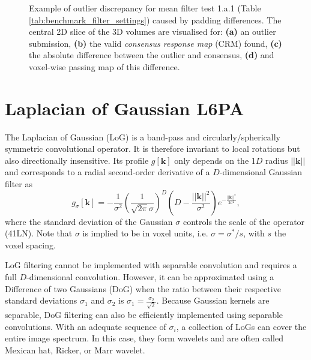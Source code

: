 \documentclass[fleqn,a4paper,oneside,openany]{book}
\newcommand\id[1]{{\hfill\normalsize{\idfont #1}}}
\newcommand\textid[1]{{\normalsize{\idfont #1}}}
\begin{document}
\begin{figure}[!t]
\begin{minipage}[b]{0.45\textwidth}
   \end{minipage} 
   \caption{Example of outlier discrepancy for mean filter test 1.a.1 (Table \ref{tab:benchmark_filter_settings}) caused by padding differences. The central 2D slice of the 3D volumes are visualised for: \textbf{(a)} an outlier submission, \textbf{(b)} the valid \textit{consensus response map} (CRM) found, \textbf{(c)} the absolute difference between the outlier and consensus,  \textbf{(d)} and voxel-wise passing map of this difference. }
   \label{fig:1a1_mean_example}
\end{figure}



\section[Laplacian of Gaussian]{Laplacian of Gaussian \id{L6PA}}\label{sec:LaplacianOfGaussian}
%
The Laplacian of Gaussian (LoG) is a band-pass and circularly/spherically symmetric convolutional operator.
It is therefore invariant to local rotations but also directionally insensitive.
Its profile $g[\boldsymbol{k}]$ only depends on the 1$D$ radius $||\boldsymbol{k}||$ and corresponds to a radial second-order derivative of a $D$-dimensional Gaussian filter as
%
\begin{equation}\label{eq:LoG}
g_{\sigma}[\boldsymbol{k}]=
-\frac{1}{\sigma^2}
\left(\frac{1}{\sqrt{2\pi}\sigma}\right)^D
\left(D-\frac{||\boldsymbol{k}||^2}{\sigma^2}\right)
e^{-\frac{||\boldsymbol{k}||^2}{2\sigma^2}},
\end{equation}
%
where the standard deviation of the Gaussian $\sigma$ controls the scale of the operator (\textid{41LN}). Note that \(\sigma\) is implied to be in voxel units, i.e. $\sigma = \sigma^* / s$, with $s$ the voxel spacing.

LoG filtering cannot be implemented with separable convolution and requires a full $D$-dimensional convolution.
However, it can be approximated using a Difference of two Gaussians (DoG) when the ratio between their respective standard deviations $\sigma_1$ and $\sigma_2$ is $\sigma_1 = \frac{\sigma_2}{\sqrt{2}}$.
Because Gaussian kernels are separable, DoG filtering can also be efficiently implemented using separable convolutions.
With an adequate sequence of $\sigma_i$, a collection of LoGs can cover the entire image spectrum. In this case, they form wavelets and are often called Mexican hat, Ricker, or Marr wavelet.
%
\end{document}
